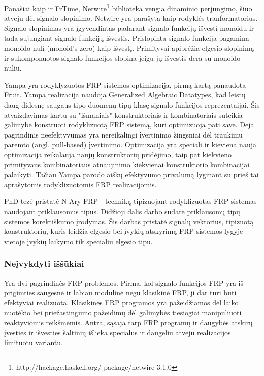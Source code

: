 Panašiai kaip ir FrTime, Netwire\footnote{http://hackage.haskell.org/ package/netwire-3.1.0} biblioteka vengia dinaminio perjungimo, šiuo atveju dėl signalo slopinimo. Netwire yra parašyta kaip rodyklės tranformatorius. Signalo slopinimas yra įgyvendintas padarant signalo funkcijų išvestį monoidu ir tada sujungiant signalo funkcijų išvestis. Prislopinta signalo funkcija pagamina monoido nulį (monoid's zero) kaip išvestį. Primityvai apibrėžia elgesio slopinimą ir sukomponuotos signalo funkcijos slopina jeigu jų išvestis dera su monoido nuliu.

Yampa \cite{Nilsson:2005:DOF:1090189.1086374} yra rodyklyzuotos FRP sistemos optimizacija, pirmą kartą panaudota Fruit. Yampa realizacija naudoja Generalized Algebraic Datatypes, kad leistų daug didesnę saugaus tipo duomenų tipų klasę signalo funkcijos reprezentaijai. Šis atvaizdavimas kartu su "išmaniais" konstruktoriais ir kombinatoriais suteikia galimybė konstruoti rodyklizuotą FRP sistemą, kuri optimizuoja pati save. Deja pagrindinis neefektyvumas yra nereikalingi įvertinimo žingsniai dėl traukimu paremto (angl. pull-based) įvertinimo. Optimizacija yra speciali ir kieviena nauja optimizacija reikalauja naujų konstruktorių pridėjimo, taip pat kiekvieno primityvaus kombinatoriaus atnaujinimo kiekvienai konstruktorio kombinacijai palaikyti. Tačiau Yampa parodo aiškų efektyvumo privalumą lyginant su prieš tai aprašytomis rodyklizuotomis FRP realizacijomis.

PhD tezė \cite{Sculthorpe11towardssafe} pristatė N-Ary FRP - techniką tipizuojant rodyklizuotas FRP sistemas naudojant priklausomus tipus. Didžioji dalis darbo sudarė priklausomų tipų sistemos korektiškumo įrodymas. Šis darbas pristatė signalų vektorius, tipizuotą konstruktorių, kuris leidžia elgesio bei įvykių atskyrimą FRP sistemos lygyje vietoje įvykių laikymo tik specialiu elgesio tipu.

\subsubsection{Neįvykdyti iššūkiai}

Yra dvi pagrindinės FRP problemos. Pirma, kol signalo-funkcijos FRP yra iš prigimties saugesnė ir labiau modulinė negu klasikinė FRP, ji dar turi būti efektyviai realizuota. Klasikinės FRP programos yra pažeidžiamos dėl laiko nuotėkio bei priežastingumo pažeidimų dėl galimybės tiesiogiai manipuliuoti reaktyviomis reikšmėmis. Antra, sąsaja tarp FRP programų ir daugybės atskirų įvesties ir išvesties šaltinių išlieka specialūs ir daugeliu atveju realizacijos limituotu variantu.

